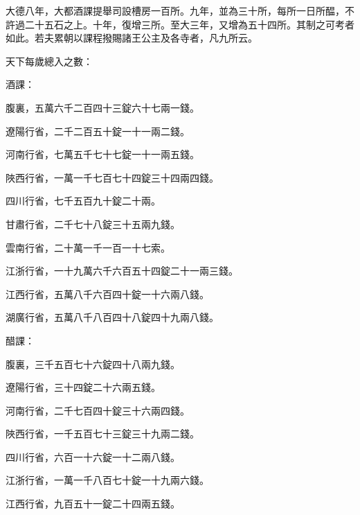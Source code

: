 \begin{pinyinscope}
 大德八年，大都酒課提舉司設槽房一百所。九年，並為三十所，每所一日所醖，不許過二十五石之上。十年，復增三所。至大三年，又增為五十四所。其制之可考者如此。若夫累朝以課程撥賜諸王公主及各寺者，凡九所云。



 天下每歲總入之數：



 酒課：



 腹裏，五萬六千二百四十三錠六十七兩一錢。



 遼陽行省，二千二百五十錠一十一兩二錢。



 河南行省，七萬五千七十七錠一十一兩五錢。



 陜西行省，一萬一千七百七十四錠三十四兩四錢。



 四川行省，七千五百九十錠二十兩。



 甘肅行省，二千七十八錠三十五兩九錢。



 雲南行省，二十萬一千一百一十七索。



 江浙行省，一十九萬六千六百五十四錠二十一兩三錢。



 江西行省，五萬八千六百四十錠一十六兩八錢。



 湖廣行省，五萬八千八百四十八錠四十九兩八錢。



 醋課：



 腹裏，三千五百七十六錠四十八兩九錢。



 遼陽行省，三十四錠二十六兩五錢。



 河南行省，二千七百四十錠三十六兩四錢。



 陜西行省，一千五百七十三錠三十九兩二錢。



 四川行省，六百一十六錠一十二兩八錢。



 江浙行省，一萬一千八百七十錠一十九兩六錢。



 江西行省，九百五十一錠二十四兩五錢。




\end{pinyinscope}
